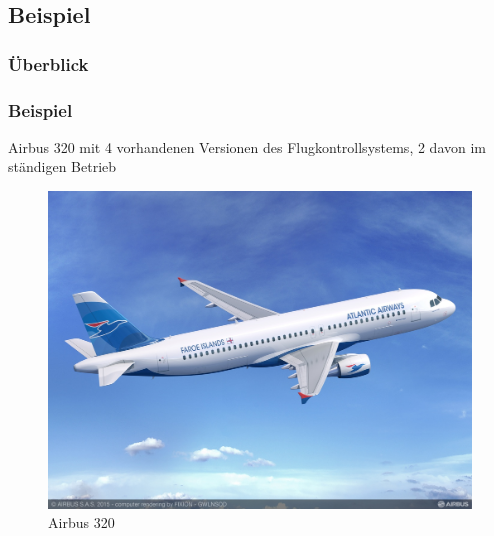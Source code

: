 \subsection{Beispiel}
%
\begin{frame}
	\frametitle{Überblick}
	\tableofcontents[currentsubsection]
\end{frame}
%
\begin{frame}
	\frametitle{Beispiel}
	Airbus 320 mit 4 vorhandenen Versionen des Flugkontrollsystems, 2 davon im ständigen Betrieb
	\begin{figure}
		\includegraphics[scale=0.13]{grafiken/A320_Atlantic_Airways.jpg}		
		\caption{Airbus 320
			\footnotemark		
		}		
	\end{figure}
\end{frame}
